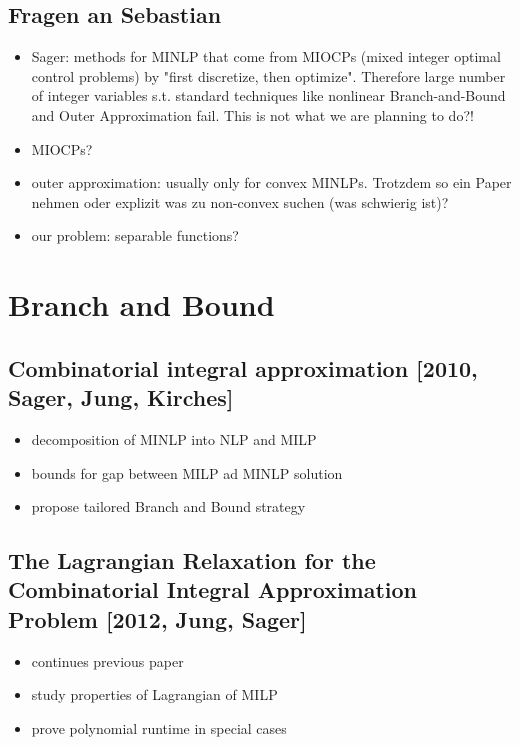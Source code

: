 \documentclass{article}
\begin{document}
\subsection{Fragen an Sebastian}
\begin{itemize}
\item Sager: methods for MINLP that come from MIOCPs (mixed integer optimal control problems) by "first discretize, then optimize". Therefore large number of integer variables s.t. standard techniques like nonlinear Branch-and-Bound and Outer Approximation fail. This is not what we are planning to do?!
\item MIOCPs?
\item outer approximation: usually only for convex MINLPs. Trotzdem so ein Paper nehmen oder explizit was zu non-convex suchen (was schwierig ist)?
\item our problem: separable functions?
\end{itemize}

\newpage
\section{Branch and Bound}
\subsection{Combinatorial integral approximation [2010, Sager, Jung, Kirches]}
\begin{itemize}
\item decomposition of MINLP into NLP and MILP
\item bounds for gap between MILP ad MINLP solution
\item propose tailored Branch and Bound strategy
\end{itemize}

\subsection{The Lagrangian Relaxation for the Combinatorial Integral Approximation Problem [2012, Jung, Sager]}
\begin{itemize}
\item continues previous paper
\item study properties of Lagrangian of MILP
\item prove polynomial runtime in special cases
\end{itemize}
\end{document}
